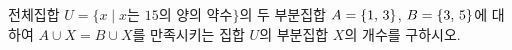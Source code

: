 전체집합 $U=\{x \mid x$는 $15$의 양의 약수$\}$의 두 부분집합 $A=\{1,\mkern3mu 3\}$, $B=\{3,\mkern3mu 5\}$에 대하여 $A\cup X=B\cup X$를 만족시키는 집합 $U$의 부분집합 $X$의 개수를 구하시오.
